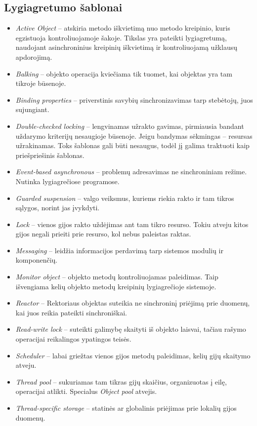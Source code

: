 \documentclass[10pt]{IEEEtran}
\begin{document}
		\subsection{Lygiagretumo šablonai}

			\begin{itemize}
				\item \textit{Active Object} -- atskiria metodo iškvietimą nuo metodo kreipinio, kuris egzistuoja kontroliuojamoje šakoje. Tikslas yra pateikti lygiagretumą, naudojant asinchroninius kreipinių iškvietimą ir kontroliuojamą užklausų apdorojimą.
				\item \textit{Balking} -- objekto operacija kviečiama tik tuomet, kai objektas yra tam tikroje būsenoje.
				\item \textit{Binding properties} -- priverstinis savybių sinchronizavimas tarp stebėtojų, juos sujungiant.
				\item \textit{Double-checked locking} -- lengvinamas užrakto gavimas, pirmiausia bandant uždarymo kriterijų nesaugioje būsenoje. Jeigu bandymas sėkmingas -- resursas užrakinamas. Toks šablonas gali būti nesaugus, todėl jį galima traktuoti kaip priešpriešinis šablonas.
				\item \textit{Event-based asynchronous} -- problemų adresavimas ne sinchroniniam režime. Nutinka lygiagrečiose programose.
				\item \textit{Guarded suspension} -- valgo veiksmus, kuriems riekia rakto ir tam tikros sąlygos, norint jas įvykdyti.
				\item \textit{Lock} -- vienos gijos rakto uždėjimas ant tam tikro resurso. Tokiu atveju kitos gijos negali prieiti prie resurso, kol nebus paleistas raktas.
				\item \textit{Messaging} -- leidžia informacijos perdavimą tarp sistemos modulių ir komponenčių.
				\item \textit{Monitor object} -- objekto metodų kontroliuojamas paleidimas. Taip išvengiama kelių objekto metodų kreipinių lygiagrečioje sistemoje. 
				\item \textit{Reactor} -- Rektoriaus objektas suteikia ne sinchroninį priėjimą prie duomenų, kai juos reikia pateikti sinchroniškai.
				\item \textit{Read-write lock} -- suteikti galimybę skaityti iš objekto laisvai, tačiau rašymo operacijai reikalingos ypatingos teisės.
				\item \textit{Scheduler} -- labai griežtas vienos gijos metodų paleidimas, kelių gijų skaitymo atveju.
				\item \textit{Thread pool} -- sukuriamas tam tikras gijų skaičius, organizuotas į eilę, operacijai atlikti. Specialus \textit{Object pool} atvejis.
				\item \textit{Thread-specific storage} -- statinės ar globalinis priėjimas prie lokalių gijos duomenų.
			\end{itemize}
\end{document}
